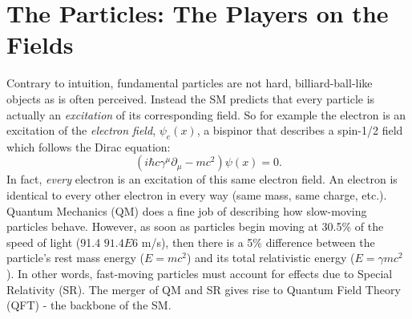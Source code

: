
\section{The Particles: The Players on the Fields}

Contrary to intuition, fundamental particles are not hard, billiard-ball-like objects as is often perceived.
Instead the SM predicts that every particle is actually an \emph{excitation} of its corresponding field.
So for example the electron is an excitation of the \emph{electron field}, $\psi_{e}(x)$, a bispinor that describes a spin-1/2 field which follows the Dirac equation: 
\begin{equation*}
    (i\hbar c \gamma^{\mu}{\partial}_{\mu} 
    - mc^{2})\psi(x) = 0.
\end{equation*}
In fact, \emph{every} electron is an excitation of this same electron field. 
An electron is identical to every other electron in every way (same mass, same charge, etc.).
Quantum Mechanics (QM) does a fine job of describing how slow-moving particles behave.
However, as soon as particles begin moving at 30.5\% of the speed of light (91.4 $91.4 E6$ m/s), then there is a 5\% difference between the particle's rest mass energy ($E = mc^2$) and its total relativistic energy ($E = \gamma mc^2$).
In other words, fast-moving particles must account for effects due to Special Relativity (SR).
The merger of QM and SR gives rise to Quantum Field Theory (QFT) - the backbone of the SM.

